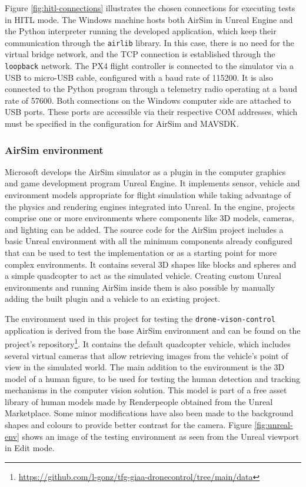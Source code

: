 Figure \ref{fig:hitl-connections} illustrates the chosen connections for executing tests in HITL mode. The Windows machine hosts both AirSim in Unreal Engine and the Python interpreter running the developed application, which keep their communication through the \texttt{airlib} library. In this case, there is no need for the virtual bridge network, and the TCP connection is established through the \texttt{loopback} network. The PX4 flight controller is connected to the simulator via a USB to micro-USB cable, configured with a baud rate of 115200. It is also connected to the Python program through a telemetry radio operating at a baud rate of 57600. Both connections on the Windows computer side are attached to USB ports. These ports are accessible via their respective COM addresses, which must be specified in the configuration for AirSim and MAVSDK.


\subsubsection{AirSim environment}

Microsoft develops the AirSim simulator as a plugin in the computer graphics and game development program Unreal Engine.
It implements sensor, vehicle and environment models appropriate for flight simulation while taking advantage of the physics and rendering engines integrated into Unreal.
In the engine, projects comprise one or more environments where components like 3D models, cameras, and lighting can be added. 
The source code for the AirSim project includes a basic Unreal environment with all the minimum components already configured that can be used to test the implementation or as a starting point for more complex environments. It contains several 3D shapes like blocks and spheres and a simple quadcopter to act as the simulated vehicle.
Creating custom Unreal environments and running AirSim inside them is also possible by manually adding the built plugin and a vehicle to an existing project.

The environment used in this project for testing the \texttt{drone-vison-control} application is derived from the base AirSim environment and can be found on the project’s repository\footnote{\url{https://github.com/l-gonz/tfg-giaa-dronecontrol/tree/main/data}}. It contains the default quadcopter vehicle, which includes several virtual cameras that allow retrieving images from the vehicle’s point of view in the simulated world. 
The main addition to the environment is the 3D model of a human figure, to be used for testing the human detection and tracking mechanisms in the computer vision solution. This model is part of a free asset library of human models made by Renderpeople \cite{render-people} obtained from the Unreal Marketplace.
Some minor modifications have also been made to the background shapes and colours to provide better contrast for the camera.
Figure \ref{fig:unreal-env} shows an image of the testing environment as seen from the Unreal viewport in Edit mode.

